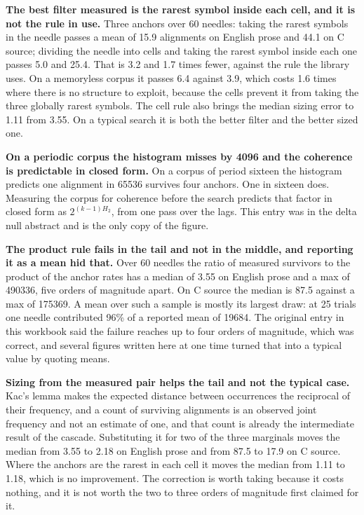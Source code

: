 \textbf{The best filter measured is the rarest symbol inside each cell, and it is not the rule in use.} Three anchors over 60 needles: taking the rarest symbols in the needle passes a mean of 15.9 alignments on English prose and 44.1 on C source; dividing the needle into cells and taking the rarest symbol inside each one passes 5.0 and 25.4. That is 3.2 and 1.7 times fewer, against the rule the library uses. On a memoryless corpus it passes 6.4 against 3.9, which costs 1.6 times where there is no structure to exploit, because the cells prevent it from taking the three globally rarest symbols. The cell rule also brings the median sizing error to 1.11 from 3.55. On a typical search it is both the better filter and the better sized one.

\textbf{On a periodic corpus the histogram misses by 4096 and the coherence is predictable in closed form.} On a corpus of period sixteen the histogram predicts one alignment in 65536 survives four anchors. One in sixteen does. Measuring the corpus for coherence before the search predicts that factor in closed form as \(2^{(k-1)H_2}\), from one pass over the lags. This entry was in the delta null abstract and is the only copy of the figure.

\textbf{The product rule fails in the tail and not in the middle, and reporting it as a mean hid that.} Over 60 needles the ratio of measured survivors to the product of the anchor rates has a median of 3.55 on English prose and a max of 490336, five orders of magnitude apart. On C source the median is 87.5 against a max of 175369. A mean over such a sample is mostly its largest draw: at 25 trials one needle contributed 96\% of a reported mean of 19684. The original entry in this workbook said the failure reaches up to four orders of magnitude, which was correct, and several figures written here at one time turned that into a typical value by quoting means.

\textbf{Sizing from the measured pair helps the tail and not the typical case.} Kac's lemma makes the expected distance between occurrences the reciprocal of their frequency, and a count of surviving alignments is an observed joint frequency and not an estimate of one, and that count is already the intermediate result of the cascade. Substituting it for two of the three marginals moves the median from 3.55 to 2.18 on English prose and from 87.5 to 17.9 on C source. Where the anchors are the rarest in each cell it moves the median from 1.11 to 1.18, which is no improvement. The correction is worth taking because it costs nothing, and it is not worth the two to three orders of magnitude first claimed for it.

